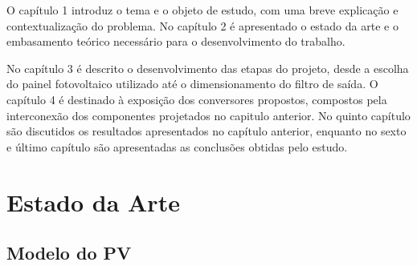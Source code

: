 \documentclass[
	12pt,				%
	openany,
	onseside,
	a4paper,			%
	english,			%
	french,				%
	spanish,			%
	brazil,				%
	]{abntex2}
\begin{document}
O capítulo 1 introduz o tema e o objeto de estudo, com uma breve explicação e contextualização do problema. No capítulo 2 é apresentado o estado da arte e o embasamento teórico necessário para o desenvolvimento do trabalho.

No capítulo 3 é descrito o desenvolvimento das etapas do projeto, desde a escolha do painel fotovoltaico utilizado até o dimensionamento do filtro de saída. O capítulo 4 é destinado à exposição dos conversores propostos, compostos pela interconexão dos componentes projetados no capitulo anterior. No quinto capítulo são discutidos os resultados apresentados no capítulo anterior, enquanto no sexto e último capítulo são apresentadas as conclusões obtidas pelo estudo.

\chapter{Estado da Arte}

\section{Modelo do PV}
\end{document}
